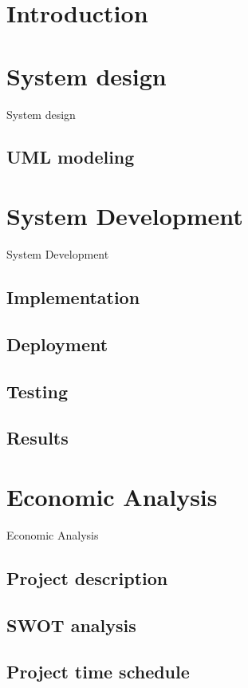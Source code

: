 \documentclass[12pt,a4paper]{report}
\begin{document}
\pagestyle{plain}
\renewcommand{\chaptername}{}

\begin{singlespacing}
\tableofcontents
\end{singlespacing}


\chapter*{Introduction}

\chapter{System design}
System design
\section{UML modeling}

\chapter{System Development}
System Development
\section{Implementation}
\section{Deployment}
\section{Testing}
\section{Results}

\chapter{Economic Analysis}
Economic Analysis
\section{Project description}
\section{SWOT analysis}
\section{Project time schedule}
\end{document}
